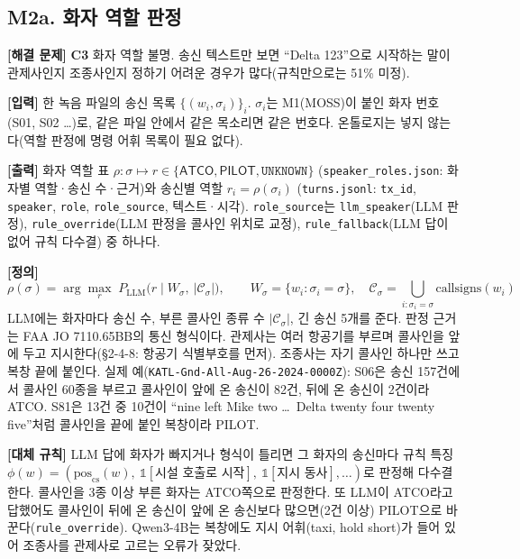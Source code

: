 \documentclass[10pt,a4paper]{article}
\newcommand{\ATCO}{\textsf{ATCO}}
\newcommand{\PILOT}{\textsf{PILOT}}
\newcommand{\ch}[1]{\textbf{\textcolor{red!60!black}{#1}}}
\begin{document}
\subsection{M2a. 화자 역할 판정}
\textbf{[해결 문제]} \ch{C3} 화자 역할 불명. 송신 텍스트만 보면 ``Delta 123''으로 시작하는 말이 관제사인지 조종사인지 정하기 어려운 경우가 많다(규칙만으로는 51\% 미정).

\textbf{[입력]} 한 녹음 파일의 송신 목록 $\{(w_i,\sigma_i)\}_{i}$. $\sigma_i$는 M1(MOSS)이 붙인 화자 번호(S01, S02 \dots)로, 같은 파일 안에서 같은 목소리면 같은 번호다. 온톨로지는 넣지 않는다(역할 판정에 명령 어휘 목록이 필요 없다).

\textbf{[출력]} 화자 역할 표 $\rho:\sigma\mapsto r\in\{\ATCO,\PILOT,\texttt{UNKNOWN}\}$ (\texttt{speaker\_roles.json}: 화자별 역할·송신 수·근거)와 송신별 역할 $r_i=\rho(\sigma_i)$ (\texttt{turns.jsonl}: \texttt{tx\_id}, \texttt{speaker}, \texttt{role}, \texttt{role\_source}, 텍스트·시각). \texttt{role\_source}는 \texttt{llm\_speaker}(LLM 판정), \texttt{rule\_override}(LLM 판정을 콜사인 위치로 교정), \texttt{rule\_fallback}(LLM 답이 없어 규칙 다수결) 중 하나다.

\textbf{[정의]}
\begin{equation}
\rho(\sigma) = \arg\max_{r}\; P_{\mathrm{LLM}}\big(r \mid W_\sigma,\ |\mathcal{C}_\sigma|\big),\qquad
W_\sigma=\{w_i:\sigma_i=\sigma\},\quad \mathcal{C}_\sigma=\textstyle\bigcup_{i:\sigma_i=\sigma}\mathrm{callsigns}(w_i)
\end{equation}
LLM에는 화자마다 송신 수, 부른 콜사인 종류 수 $|\mathcal{C}_\sigma|$, 긴 송신 5개를 준다. 판정 근거는 FAA JO 7110.65BB의 통신 형식이다. 관제사는 여러 항공기를 부르며 콜사인을 앞에 두고 지시한다(\S2-4-8: 항공기 식별부호를 먼저). 조종사는 자기 콜사인 하나만 쓰고 복창 끝에 붙인다. 실제 예(\texttt{KATL-Gnd-All-Aug-26-2024-0000Z}): S06은 송신 157건에서 콜사인 60종을 부르고 콜사인이 앞에 온 송신이 82건, 뒤에 온 송신이 2건이라 \ATCO. S81은 13건 중 10건이 ``nine left Mike two \dots\ Delta twenty four twenty five''처럼 콜사인을 끝에 붙인 복창이라 \PILOT.

\textbf{[대체 규칙]} LLM 답에 화자가 빠지거나 형식이 틀리면 그 화자의 송신마다 규칙 특징 $\phi(w)=(\mathrm{pos}_{\mathrm{cs}}(w),\ \mathbb{1}[\text{시설 호출로 시작}],\ \mathbb{1}[\text{지시 동사}],\dots)$로 판정해 다수결한다. 콜사인을 3종 이상 부른 화자는 \ATCO 쪽으로 판정한다. 또 LLM이 \ATCO{}라고 답했어도 콜사인이 뒤에 온 송신이 앞에 온 송신보다 많으면(2건 이상) \PILOT{}으로 바꾼다(\texttt{rule\_override}). Qwen3-4B는 복창에도 지시 어휘(taxi, hold short)가 들어 있어 조종사를 관제사로 고르는 오류가 잦았다.
\end{document}
